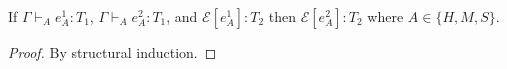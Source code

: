 \begin{lemma}
\label{ecp}
If $\Gamma\vdash_{A}e_{A}^{1}:T_{1}$, $\Gamma\vdash_{A}e_{A}^{2}:T_{1}$, and $\mathscr{E}[e_{A}^{1}]:T_{2}$ then $\mathscr{E}[e_{A}^{2}]:T_{2}$ where $A\in\lbrace H,M,S\rbrace$.
\begin{proof}
By structural induction.
\end{proof}
\end{lemma}